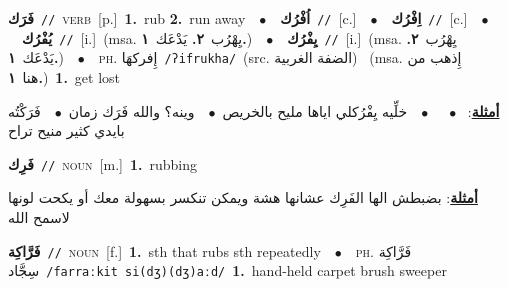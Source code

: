\documentclass[10pt,a4paper,twoside]{article} %
\begin{document}
\begin{multicols}{2}
{\setlength\topsep{0pt}\textbf{\foreignlanguage{arabic}{فَرَك}}\ {\color{gray}\texttt{//}\color{black}}\ \textsc{verb}\ [p.]\ \textbf{1.}~rub  \textbf{2.}~run away\ \ $\bullet$\ \ \setlength\topsep{0pt}\textbf{\foreignlanguage{arabic}{اُفْرُك}}\ {\color{gray}\texttt{//}\color{black}}\ [c.]\ \ $\bullet$\ \ \setlength\topsep{0pt}\textbf{\foreignlanguage{arabic}{اِفْرُك}}\ {\color{gray}\texttt{//}\color{black}}\ [c.]\ \ $\bullet$\ \ \setlength\topsep{0pt}\textbf{\foreignlanguage{arabic}{يُفْرُك}}\ {\color{gray}\texttt{//}\color{black}}\ [i.]\ \color{gray}(msa. \foreignlanguage{arabic}{يِهْرُب}~\foreignlanguage{arabic}{\textbf{٢.}}  \foreignlanguage{arabic}{يَدْعَك}~\foreignlanguage{arabic}{\textbf{١.}})\color{black}\ \ $\bullet$\ \ \setlength\topsep{0pt}\textbf{\foreignlanguage{arabic}{يِفْرُك}}\ {\color{gray}\texttt{//}\color{black}}\ [i.]\ \color{gray}(msa. \foreignlanguage{arabic}{يِهْرُب}~\foreignlanguage{arabic}{\textbf{٢.}}  \foreignlanguage{arabic}{يَدْعَك}~\foreignlanguage{arabic}{\textbf{١.}})\color{black}\ \ $\bullet$\ \ \textsc{ph.} \color{gray} \foreignlanguage{arabic}{إِفركهَا}\color{black}\ {\color{gray}\texttt{/{\sffamily ʔifrukha}/}\color{black}}\ \color{gray}(src. \foreignlanguage{arabic}{الضفة الغربية})\color{black}\ \color{gray} (msa. \foreignlanguage{arabic}{إِذهب من هنا}~\foreignlanguage{arabic}{\textbf{١.}})\color{black}\ \textbf{1.}~get lost\  \begin{flushright}\color{gray}\foreignlanguage{arabic}{\textbf{\underline{\foreignlanguage{arabic}{أمثلة}}}: \ $\bullet$\ \  \ $\bullet$\ \  خلِّيه يِفْرُكلي اياها مليح بالخريص\ $\bullet$\ \  وينه؟ والله فَرَك زمان\ $\bullet$\ \  فَرَكْتُه بايدي كثير منيح تراح}\end{flushright}\color{black}} \vspace{2mm}

{\setlength\topsep{0pt}\textbf{\foreignlanguage{arabic}{فَرِك}}\ {\color{gray}\texttt{//}\color{black}}\ \textsc{noun}\ [m.]\ \textbf{1.}~rubbing\  \begin{flushright}\color{gray}\foreignlanguage{arabic}{\textbf{\underline{\foreignlanguage{arabic}{أمثلة}}}: بضبطش الها الفَرِك عشانها هشة ويمكن تنكسر بسهولة معك أو يكحت لونها لاسمح الله}\end{flushright}\color{black}} \vspace{2mm}

{\setlength\topsep{0pt}\textbf{\foreignlanguage{arabic}{فَرَّاكِة}}\ {\color{gray}\texttt{//}\color{black}}\ \textsc{noun}\ [f.]\ \textbf{1.}~sth that rubs sth repeatedly\ \ $\bullet$\ \ \textsc{ph.} \color{gray} \foreignlanguage{arabic}{فَرَّاكِة سِجَّاد}\color{black}\ {\color{gray}\texttt{/{\sffamily farraːkit si(dʒ)(dʒ)aːd}/}\color{black}}\ \textbf{1.}~hand-held carpet brush sweeper\ } \vspace{2mm}


\end{multicols}
\end{document}

